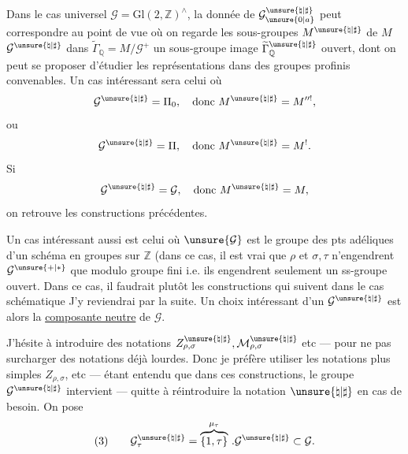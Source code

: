 Dans le cas universel $\mathcal{G}=\mathrm{Gl}(2,\mathbb{Z})^{\wedge}$,
la donnée de $\mathcal{G}_{\unsure{0|a}}^{\unsure{\natural|\sharp}}$
peut correspondre au point de vue où on regarde les sous-groupes
$M^{\unsure{\natural|\sharp}}$ de $M$
$\mathcal{G}^{\unsure{\natural|\sharp}}$
dans $\widetilde{\Gamma}_{\mathbb{Q}}=M/\mathcal{G}^{+}$
un sous-groupe image
$\widetilde{\Gamma}_{\mathbb{Q}}^{\unsure{\natural|\sharp}}$
ouvert, dont on peut se proposer d'étudier les représentations dans des groupes
profinis convenables. Un cas intéressant sera celui où
\[
\mathcal{G}^{\unsure{\natural|\sharp}}=\Pi_{0},\quad
\text{donc }M^{\unsure{\natural|\sharp}}=M^{\prime\prime!},
\]
ou
\[
\mathcal{G}^{\unsure{\natural|\sharp}}=\Pi,\quad
\text{donc }M^{\unsure{\natural|\sharp}}=M^{!}.
\]
Si
\[
\mathcal{G}^{\unsure{\natural|\sharp}}=\mathcal{G},\quad
\text{donc }M^{\unsure{\natural|\sharp}}=M,
\]
on retrouve les constructions précédentes.



Un cas intéressant aussi est celui où $\unsure{\mathcal{G}}$ est le groupe
des pts adéliques  d'un schéma en groupes sur $\mathbb{Z}$
(dans ce cas, il est vrai que $\rho$ et $\sigma,\tau$ n'engendrent
 $\mathcal{G}^{\unsure{+|*}}$ que modulo groupe fini
i.e. ils engendrent  seulement un ss-groupe ouvert.
Dans ce cas, il faudrait plutôt \uline{} les constructions
qui suivent dans le cas schématique
J'y reviendrai par la suite. Un choix intéressant d'un
$\mathcal{G}^{\unsure{\natural|\sharp}}$ est alors la
\uline{composante neutre} de $\mathcal{G}$.

J'hésite à introduire des notations
$Z_{\rho,\sigma}^{\unsure{\natural|\sharp}},\mathcal{M}_{\rho,\sigma}^{\unsure{\natural|\sharp}}$
etc --- pour ne pas surcharger des notations déjà lourdes. Donc je préfère
utiliser les notations plus simples $Z_{\rho,\sigma}$, etc --- étant entendu
que dans ces constructions, le groupe $\mathcal{G}^{\unsure{\natural|\sharp}}$
intervient --- quitte à réintroduire la notation $\unsure{\natural|\sharp}$
en cas de besoin.
On pose
\[
(3)\qquad
\mathcal{G}_{\tau}^{\unsure{\natural|\sharp}}
=\overbrace{\{1,\tau\}}^{\mu_{\tau}}\,.
\mathcal{G}^{\unsure{\natural|\sharp}}\subset\mathcal{G}.
\]

